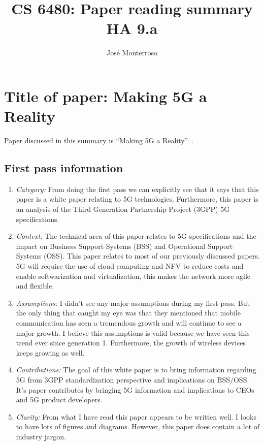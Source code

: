 \documentclass[letterpaper,twocolumn,10pt]{article}
\title{CS 6480: Paper reading summary\\
HA 9.a\\}
\author{José Monterroso}
\affil{School of Computing, University of Utah}
\begin{document}
\maketitle
\section{Title of paper: Making 5G a Reality}

Paper discussed in this summary is ``Making 5G a Reality''~\cite{5gwhite}.

\subsection{First pass information}
\label{sec:first}

\begin{enumerate}

\item {\it Category:} 
From doing the first pass we can explicitly see that it says that this paper is a white paper relating to 5G
technologies. Furthermore, this paper is an analysis of the Third Generation Partnership Project (3GPP) 
5G specifications. 

\item {\it Context:}
The technical area of this paper relates to 5G specifications and the impact on Business Support Systems 
(BSS) and Operational Support Systems (OSS). This paper relates to most of our previously discussed papers.
5G will require the use of cloud computing and NFV to reduce costs and enable softwarization and virtualization,
this makes the network more agile and flexible. 

\item {\it Assumptions:} 
I didn't see any major assumptions during my first pass. But the only thing that caught my eye was that they
mentioned that mobile communication has seen a tremendous growth and will continue to see a major 
growth. I believe this assumptions is valid because we have seen this trend ever since generation 1. Furthermore,
the growth of wireless devices keeps growing as well. 

\item {\it Contributions:} 
The goal of this white paper is to bring information regarding 5G from 3GPP standardization perspective and 
implications on BSS/OSS. It's paper contributes by bringing 5G information and implications to CEOs and 5G
product developers. 

\item {\it Clarity:} 
From what I have read this paper appears to be written well. I looks to have lots of figures and
diagrams. However, this paper does contain a lot of industry jargon. 

\end{enumerate}
\end{document}
